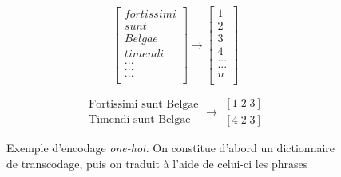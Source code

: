 
\begin{figure}
    \centering
    \noindent\begin{minipage}{.32\linewidth}
        \begin{equation*}
            \begin{bmatrix}
            fortissimi \\ 
            sunt \\ 
            Belgae \\ 
            timendi \\ 
            ... \\ 
            ... \\ 
            ... \\ 
            \end{bmatrix}
            \rightarrow \begin{bmatrix}
            1 \\ 
            2 \\ 
            3 \\ 
            4 \\ 
            ... \\ 
            ... \\ 
            n \\ 
            \end{bmatrix}
        \end{equation*}
    \end{minipage}%
    \begin{minipage}{.32\linewidth}
        \begin{equation*}
            \begin{matrix}
            \textrm{Fortissimi sunt Belgae}\\ 
            \textrm{Timendi sunt Belgae}
            \end{matrix}
            \rightarrow
            \begin{matrix}
            \left [ 1\;  2\;  3 \right ]\\ 
            \left [ 4\;  2\;  3 \right ]
            \end{matrix}
        \end{equation*}
    \end{minipage}
    \caption{Exemple d'encodage\textit{ one-hot}. On constitue d'abord un dictionnaire de transcodage, puis on traduit à l'aide de celui-ci les phrases}
    \label{deep-learning:one-hot-encoding}
\end{figure}